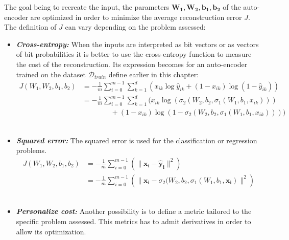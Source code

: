 \documentclass[a4paper,11pt]{report}
\newcommand{\Important}[1]{\textbf{{\em #1}}}
\begin{document}
		The goal being to recreate the input, the parameters $\mathbf{W_{1}}, \mathbf{W_{2}}, \mathbf{b_{1}}, \mathbf{b_{2}}$ of the auto-encoder are optimized in order to minimize the average reconstruction error $J$. The definition of $J$ can vary depending on the problem assessed:\\
		
		\begin{itemize}
			\item \Important{Cross-entropy:} When the inputs are interpreted as bit vectors  or as vectors of bit probabilities it is better to use the cross-entropy function to measure the cost of the reconstruction. Its expression becomes for an auto-encoder trained on the dataset $\mathcal{D}_{train}$ define earlier in this chapter:
				\begin{equation}
					\begin{split}
							J(W_{1},W_{2},b_{1}, b_{2})
												&= -\frac{1}{m} \sum_{i=0}^{m-1} \sum^{d}_{k=1}\left(x_{ik} \log \hat{y}_{ik} + (1 - x_{ik})\log(1 - \hat{y}_{ik})\right)
												\\
												&= -\frac{1}{m} \sum_{i=0}^{m-1} \sum^{d}_{k=1}(x_{ik} \log(\sigma_{2}(W_{2}, b_{2}, \sigma_{1}(W_{1}, b_{1}, x_{ik}))) \\ 
													&\quad\quad\quad\quad + (1 - x_{ik})\log(1 - \sigma_{2}(W_{2}, b_{2}, \sigma_{1}(W_{1}, b_{1}, x_{ik}))))
						\end{split}
				\end{equation}\\
				
			\item \Important{Squared error:} The squared error is used for the classification or regression problems.
				\begin{equation}
					\begin{split}
						J(W_{1},W_{2},b_{1}, b_{2})
												&= -\frac{1}{m} \sum_{i=0}^{m-1} \left( \|\mathbf{x_{i}}-\mathbf{\hat{y}_{i}}\|^{2} \right) \\
												&= -\frac{1}{m} \sum_{i=0}^{m-1} \left( \|\mathbf{x_{i}}- \sigma_{2}(W_{2}, b_{2}, \sigma_{1}(W_{1}, b_{1}, \mathbf{x_{i}})   \|^{2} \right)
					\end{split}
				\end{equation}\\
				
			\item \Important{Personalize cost:} Another possibility is to define a metric tailored to the specific problem assessed. This metrics has to admit derivatives in order to allow its optimization.\\
		\end{itemize}
		
\end{document}
